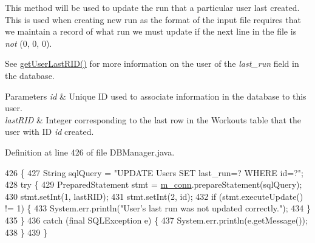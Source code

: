 This method will be used to update the run that a particular user last created. This is used when creating new run as the format of the input file requires that we maintain a record of what run we must update if the next line in the file is {\itshape not} (0, 0, 0).

See \hyperlink{classcom_1_1activitytracker_1_1_d_b_manager_aab14c61b3f3a17bdea10cab1b5fd9337}{get\+User\+Last\+R\+I\+D()} for more information on the user of the {\itshape last\+\_\+run} field in the database.


\begin{DoxyParams}{Parameters}
{\em id} & Unique ID used to associate information in the database to this user. \\
\hline
{\em last\+R\+ID} & Integer corresponding to the last row in the Workouts table that the user with ID {\itshape id} created. \\
\hline
\end{DoxyParams}


Definition at line 426 of file D\+B\+Manager.\+java.


\begin{DoxyCode}
426                                                                 \{
427         String sqlQuery = \textcolor{stringliteral}{"UPDATE Users SET last\_run=? WHERE id=?"};
428         \textcolor{keywordflow}{try} \{
429             PreparedStatement stmt = \hyperlink{classcom_1_1activitytracker_1_1_d_b_manager_a064088d13ac09eb147fdc19268771521}{m\_conn}.prepareStatement(sqlQuery);
430             stmt.setInt(1, lastRID);
431             stmt.setInt(2, \textcolor{keywordtype}{id});
432             \textcolor{keywordflow}{if} (stmt.executeUpdate() != 1) \{
433                 System.err.println(\textcolor{stringliteral}{"User's last run was not updated correctly."});
434             \}
435         \}
436         \textcolor{keywordflow}{catch} (\textcolor{keyword}{final} SQLException e) \{
437             System.err.println(e.getMessage());
438         \}
439     \}
\end{DoxyCode}
